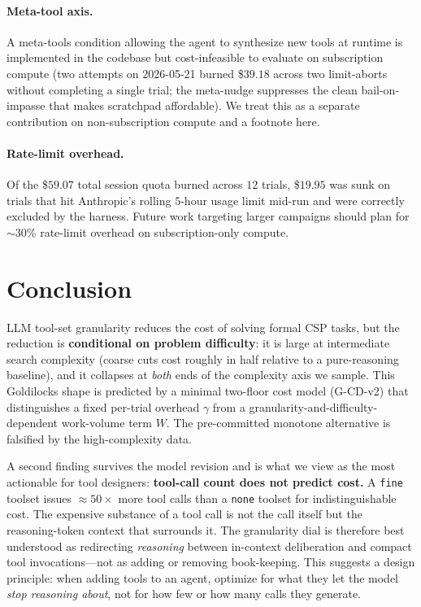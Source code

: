 \documentclass[11pt,letterpaper]{article}
\begin{document}
\paragraph{Meta-tool axis.} A meta-tools condition allowing the
agent to synthesize new tools at runtime is implemented in the
codebase but cost-infeasible to evaluate on subscription compute
(two attempts on 2026-05-21 burned \$$39.18$ across two
limit-aborts without completing a single trial; the meta-nudge
suppresses the clean bail-on-impasse that makes scratchpad
affordable). We treat this as a separate contribution on
non-subscription compute and a footnote here.

\paragraph{Rate-limit overhead.}
Of the \$$59.07$ total session quota burned across $12$ trials,
\$$19.95$ was sunk on trials that hit Anthropic's rolling $5$-hour
usage limit mid-run and were correctly excluded by the harness.
Future work targeting larger campaigns should plan for
${\sim}30\%$ rate-limit overhead on subscription-only compute.


\section{Conclusion}
\label{sec:conclusion}

LLM tool-set granularity reduces the cost of solving formal CSP
tasks, but the reduction is \textbf{conditional on problem
difficulty}: it is large at intermediate search complexity (coarse
cuts cost roughly in half relative to a pure-reasoning baseline),
and it collapses at \emph{both} ends of the complexity axis we
sample. This Goldilocks shape is predicted by a minimal two-floor
cost model (G-CD-v2) that distinguishes a fixed per-trial overhead
$\gamma$ from a granularity-and-difficulty-dependent work-volume
term $W$. The pre-committed monotone alternative is falsified by
the high-complexity data.

A second finding survives the model revision and is what we view
as the most actionable for tool designers: \textbf{tool-call count
does not predict cost.} A \texttt{fine} toolset issues
${\approx}50\times$ more tool calls than a \texttt{none} toolset
for indistinguishable cost. The expensive substance of a tool call
is not the call itself but the reasoning-token context that
surrounds it. The granularity dial is therefore best understood as
redirecting \emph{reasoning} between in-context deliberation and
compact tool invocations---not as adding or removing book-keeping.
This suggests a design principle: when adding tools to an agent,
optimize for what they let the model \emph{stop reasoning about},
not for how few or how many calls they generate.




\end{document}
